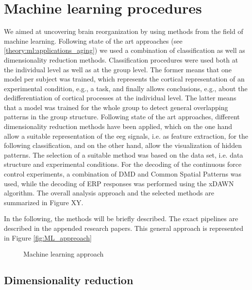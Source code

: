 \section{Machine learning procedures} 
We aimed at uncovering brain reorganization by using methods from the field of machine learning. Following state of the art approaches (see \autoref{theory:ml:applications_aging}) we used a combination of classification as well as dimensionality reduction methods. Classification procedures were used both at the individual level as well as at the group level. The former means that one model per subject was trained, which represents the cortical representation of an experimental condition, e.g., a task, and finally allows conclusions, e.g., about the dedifferentiation of cortical processes at the individual level. The latter means that a model was trained for the whole group to detect general overlapping patterns in the group structure. Following state of the art approaches, different dimensionality reduction methods have been applied, which on the one hand allow a suitable representation of the \gls{eeg} signals, i.e. as feature extraction, for the following classification, and on the other hand, allow the visualization of hidden patterns. The selection of a suitable method was based on the data set, i.e. data structure and experimental conditions. For the decoding of the continuous force control experiments, a combination of DMD and Common Spatial Patterns was used, while the decoding of ERP responses was performed using the xDAWN algorithm. The overall analysis approach and the selected methods are summarized in Figure XY. 

In the following, the methods will be briefly described. The exact pipelines are described in the appended research papers. This general approach is represented in Figure \autoref{fig:ML_appreoach}
\begin{figure}
  \caption{Machine learning approach}
  \label{fig:ML_appreoach}
\end{figure}

\subsection{Dimensionality reduction}

